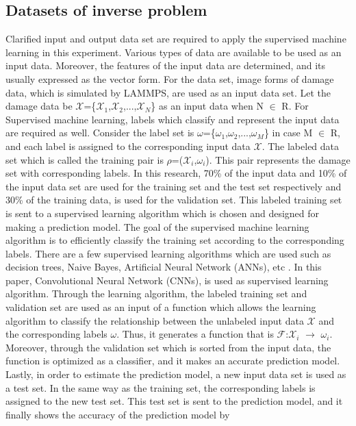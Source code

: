 

\subsection{Datasets of inverse problem}
\label{subsec1}

Clarified input and output data set are required to apply the supervised machine learning in this experiment. Various types of data are available to be used as an input data. Moreover, the features of the input data are determined, and its usually expressed as the vector form. For the data set, image forms of damage data, which is simulated by LAMMPS, are used as an input data set. Let the damage data be $\mathcal{X}$=\{$\mathcal{X}_1$,$\mathcal{X}_2$,...,$\mathcal{X}_N$\} as an input data when N $\in$ R. For Supervised machine learning, labels which classify and represent the input data are required as well. Consider the label set is $\omega$=\{$\omega_1$,$\omega_2$,...,$\omega_M$\} in case M $\in$ R, and each label is assigned to the corresponding input data $\mathcal{X}$. The labeled data set which is called the training pair is $\rho$=($\mathcal{X}_i$,$\omega_i$). This pair represents the damage set with corresponding labels. In this research, 70\% of the input data and 10\% of the input data set are used for the training set and the test set respectively and 30\% of the training data, is used for the validation set. This labeled training set is sent to a supervised learning algorithm which is chosen and designed for making a prediction model. The goal of the supervised machine learning algorithm is to efficiently classify the training set according to the corresponding labels. There are a few supervised learning algorithms which are used such as decision trees, Naive Bayes, Artificial Neural Network (ANNs), etc \cite{Ref18}. In this paper, Convolutional Neural Network (CNNs), is used as supervised learning algorithm. Through the learning algorithm, the labeled training set and validation set are used as an input of a function which allows the learning algorithm to classify the relationship between the unlabeled input data $\mathcal{X}$ and the corresponding labels $\omega$. Thus, it generates a function that is $\mathcal{F}$:$\mathcal{X}_i$ $\rightarrow$ $\omega_i$. Moreover, through the validation set which is sorted from the input data, the function is optimized as a classifier, and it makes an accurate prediction model. Lastly, in order to estimate the prediction model, a new input data set is used as a test set. In the same way as the training set, the corresponding labels is assigned to the new test set. This test set is sent to the prediction model, and it finally shows the accuracy of the prediction model by 